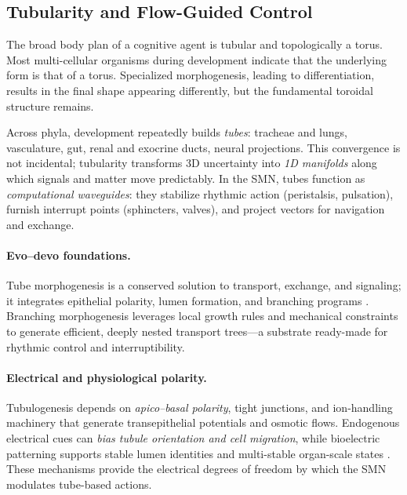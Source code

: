 
\subsection{Tubularity and Flow-Guided Control}
\label{subsec:tubular}

The broad body plan of a cognitive agent is tubular and topologically a torus. Most multi-cellular organisms during development indicate that the underlying form is that of a torus. Specialized morphogenesis, leading to differentiation, results in the final shape appearing differently, but the fundamental toroidal structure remains.

Across phyla, development repeatedly builds \emph{tubes}: tracheae and lungs, vasculature, gut, renal and exocrine ducts, neural projections.
This convergence is not incidental; tubularity transforms 3D uncertainty into \emph{1D manifolds} along which signals and matter move predictably.
In the SMN, tubes function as \emph{computational waveguides}: they stabilize rhythmic action (peristalsis, pulsation), furnish interrupt points (sphincters, valves), and project vectors for navigation and exchange.

\paragraph{Evo--devo foundations.}
Tube morphogenesis is a conserved solution to transport, exchange, and signaling; it integrates epithelial polarity, lumen formation, and branching programs \cite{LubarskyKrasnow2003TubeMorphogenesis,AffolterZellerCaussinus2009Branching,VarnerNelson2014Branching}.
Branching morphogenesis leverages local growth rules and mechanical constraints to generate efficient, deeply nested transport trees---a substrate ready-made for rhythmic control and interruptibility.

\paragraph{Electrical and physiological polarity.}
Tubulogenesis depends on \emph{apico--basal polarity}, tight junctions, and ion-handling machinery that generate transepithelial potentials and osmotic flows.
Endogenous electrical cues can \emph{bias tubule orientation and cell migration}, while bioelectric patterning supports stable lumen identities and multi-stable organ-scale states \cite{McCaigRajnicekSongZhao2005ElecControl,Levin2014MolecularBioelectricity}.
These mechanisms provide the electrical degrees of freedom by which the SMN modulates tube-based actions.

